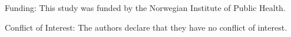 \documentclass[12pt]{article}
\begin{document}
\vspace{3cm}

Funding: This study was funded by the Norwegian Institute of Public Health.


Conflict of Interest: The authors declare that they have no conflict of interest.


\newpage

\printbibliography

\newpage

\processdelayedfloats

\clearpage

\makeatletter
\efloat@restorefloats
\makeatother

\appendix

\renewcommand{\thefigure}{S\arabic{figure}}
\renewcommand{\thepostfigure}{S\arabic{postfigure}}
\setcounter{figure}{0}
\setcounter{postfigure}{0}

\renewcommand{\thetable}{S\arabic{table}}
\renewcommand{\theposttable}{S\arabic{posttable}}
\setcounter{table}{0}
\setcounter{posttable}{0}


\setcounter{page}{1}


\begin{table}
	\caption{}
	\label{tab:regmodels}
\end{table}

\begin{table}
	\caption{}
	\label{tab:gwas}
\end{table}

\begin{table}
	\caption{}
	\label{tab:rg}
\end{table}

\begin{table}
	\caption{}
	\label{tab:estimates-UR}
\end{table}


\begin{figure}
	\caption{}
	\label{fig:prop_moba_ssb}
\end{figure}

\begin{figure}
	\caption{}
	\label{fig:coverage}
\end{figure}

\begin{figure}
	\caption{}
	\label{fig:ADHDsumscore}
\end{figure}
\end{document}
